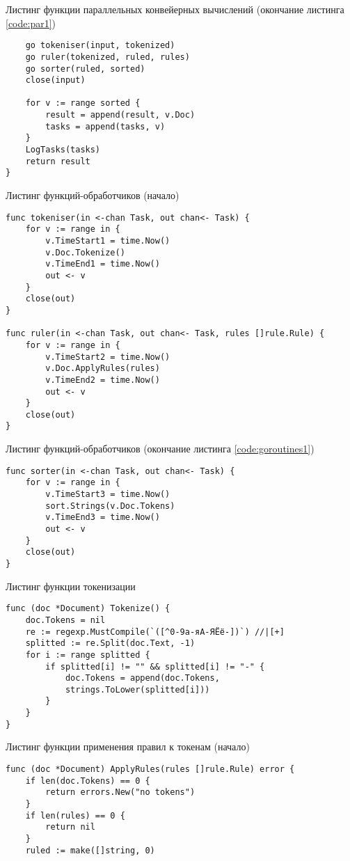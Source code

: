 \begin{code}
\caption{Листинг функции параллельных конвейерных вычислений (окончание листинга \ref{code:par1})}
\label{code:par2}
\begin{verbatim}
	go tokeniser(input, tokenized)
	go ruler(tokenized, ruled, rules)
	go sorter(ruled, sorted)
	close(input)

	for v := range sorted {
		result = append(result, v.Doc)
		tasks = append(tasks, v)
	}
	LogTasks(tasks)
	return result
}
\end{verbatim}
\end{code}

\begin{code}
\caption{Листинг функций-обработчиков (начало)}
\label{code:goroutines1}
\begin{verbatim}
func tokeniser(in <-chan Task, out chan<- Task) {
	for v := range in {
		v.TimeStart1 = time.Now()
		v.Doc.Tokenize()
		v.TimeEnd1 = time.Now()
		out <- v
	}
	close(out)
}

func ruler(in <-chan Task, out chan<- Task, rules []rule.Rule) {
	for v := range in {
		v.TimeStart2 = time.Now()
		v.Doc.ApplyRules(rules)
		v.TimeEnd2 = time.Now()
		out <- v
	}
	close(out)
}
\end{verbatim}
\end{code}

\begin{code}
\caption{Листинг функций-обработчиков (окончание листинга \ref{code:goroutines1})}
\label{code:goroutines2}
\begin{verbatim}
func sorter(in <-chan Task, out chan<- Task) {
	for v := range in {
		v.TimeStart3 = time.Now()
		sort.Strings(v.Doc.Tokens)
		v.TimeEnd3 = time.Now()
		out <- v
	}
	close(out)
}
\end{verbatim}
\end{code}

\begin{code}
\caption{Листинг функции токенизации}
\label{code:token}
\begin{verbatim}
func (doc *Document) Tokenize() {
	doc.Tokens = nil
	re := regexp.MustCompile(`([^0-9а-яА-ЯЁё-])`) //|[+]
	splitted := re.Split(doc.Text, -1)
	for i := range splitted {
		if splitted[i] != "" && splitted[i] != "-" {
			doc.Tokens = append(doc.Tokens,
			strings.ToLower(splitted[i]))
		}
	}
}
\end{verbatim}
\end{code}

\begin{code}
\caption{Листинг функции применения правил к токенам (начало)}
\label{code:rule1}
\begin{verbatim}
func (doc *Document) ApplyRules(rules []rule.Rule) error {
	if len(doc.Tokens) == 0 {
		return errors.New("no tokens")
	}
	if len(rules) == 0 {
		return nil
	}
	ruled := make([]string, 0)
\end{verbatim}
\end{code}

